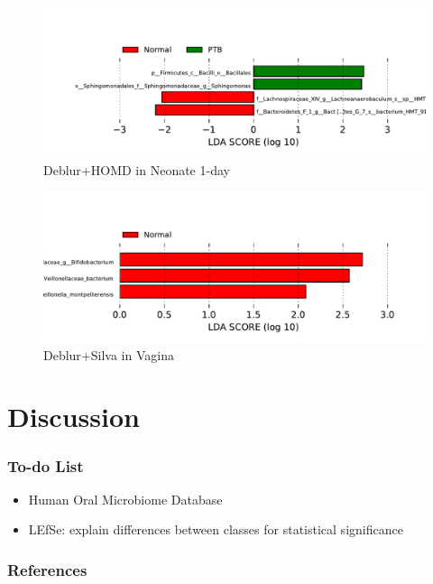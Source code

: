 \documentclass{beamer}
\begin{document}
\begin{frame}[allowframebreaks]
        \begin{figure}
            \includegraphics[width=\linewidth]{figures/LEfSe/Default/everything.Deblur.homd.Neonate-1day.pdf}
            \caption{Deblur+HOMD in Neonate 1-day}
        \end{figure}

        \begin{figure}
            \includegraphics[width=\linewidth]{figures/LEfSe/Default/everything.Deblur.silva.Vagina.pdf}
            \caption{Deblur+Silva in Vagina}
        \end{figure}
    \end{frame}

    \section{Discussion}
    \begin{frame}
        \frametitle{To-do List}

        \begin{itemize}
            \item Human Oral Microbiome Database
            \item LEfSe: explain differences between classes for statistical significance
        \end{itemize}
    \end{frame}

   	\begin{frame}[allowframebreaks]
        \frametitle{References}
        
        
    \end{frame}
\end{document}
